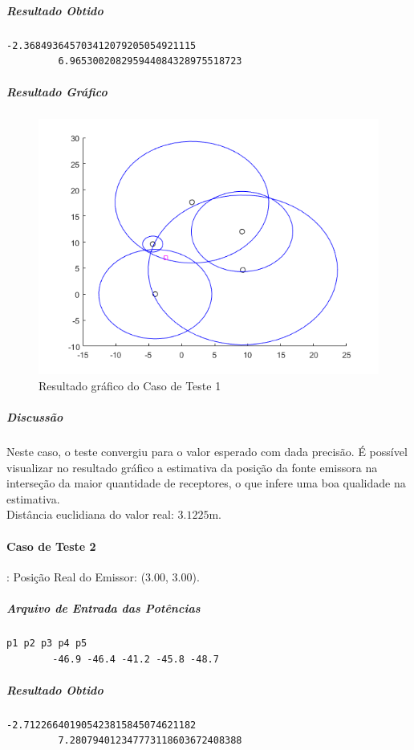 	\subparagraph{Resultado Obtido}
	\begin{Verbatim}[fontsize=\footnotesize]
		-2.368493645703412079205054921115
		 6.965300208295944084328975518723
	\end{Verbatim}

	\subparagraph{Resultado Gráfico}
	\begin{figure}[h]
		\centering
		\includegraphics[scale = 0.7]{ct_1}
		\caption{Resultado gráfico do Caso de Teste 1}
	\end{figure}

	\subparagraph{Discussão}
	Neste caso, o teste convergiu para o valor esperado com dada precisão. É possível
	visualizar no resultado gráfico a estimativa da posição da fonte emissora na interseção
	da maior quantidade de receptores, o que infere uma boa qualidade na estimativa.\\
	Distância euclidiana do valor real: $3.1225$m.

	\paragraph{Caso de Teste 2}: Posição Real do Emissor: ($3.00$, $3.00$).
	\subparagraph{Arquivo de Entrada das Potências}
	\begin{Verbatim}[fontsize=\footnotesize]
		p1 p2 p3 p4 p5
		-46.9 -46.4 -41.2 -45.8 -48.7
	\end{Verbatim}

	\subparagraph{Resultado Obtido}
	\begin{Verbatim}[fontsize=\footnotesize]
		-2.712266401905423815845074621182
		 7.280794012347773118603672408388
	\end{Verbatim}


